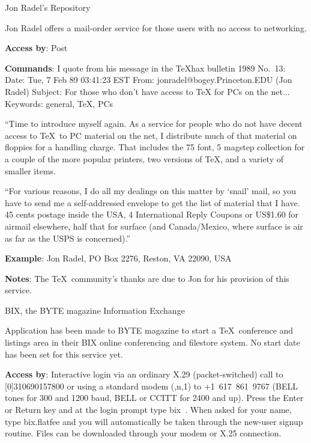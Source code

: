  {Jon Radel's Repository}

     Jon Radel offers a mail-order service for those users with no
     access to networking.

{\bf Access by}:  Post

{\bf Commands}:  I quote from his message in the TeXhax bulletin 1989
     No.~13:\nl
{\tx Date: Tue, 7 Feb 89 03:41:23 EST }\nl
{\tx From: jonradel@bogey.Princeton.EDU (Jon Radel) }\nl
{\tx Subject: For those who don't have access to TeX for PCs on the
              net...}\nl
{\tx Keywords: general, TeX, PCs }

   ``Time to introduce myself again. As a service for people who do not
     have decent access to \TeX\ to PC material on the net, I distribute
     much of that material on floppies for a handling charge.  That
     includes the 75 font, 5 magstep collection for a couple of the
     more popular printers, two versions of \TeX, and a variety of
     smaller items.

   ``For various reasons, I do all my dealings on this matter by `snail'
     mail, so you have to send me a self-addressed envelope to get the
     list of material that I have.  45 cents postage inside the USA,  4
     International Reply Coupons or US\$1.60 for airmail elsewhere, half
     that for surface (and Canada/Mexico, where surface is air as far as
     the USPS is concerned).''

{\bf Example}:\nl
     Jon Radel, \nl
     PO Box 2276, \nl
     Reston, \nl
     VA 22090, \nl
     USA

{\bf Notes}:  The \TeX\ community's thanks are due to Jon for his
     provision of this service.

 {BIX, the BYTE magazine Information
     Exchange}

     Application has been made to BYTE magazine to start a \TeX\
     conference and listings area in their BIX online conferencing
     and filestore system. No start date has been set for this service
     yet.

{\bf Access by}:  Interactive login via an ordinary X.29 (packet-switched)
     call to [0]310690157800 or using a standard modem ({\tx 8,n,1}) to
     +1~617~861~9767 (BELL tones for 300 and 1200 baud, BELL or CCITT
     for 2400 and up). Press the Enter or Return key and at the login
     prompt type {\tx bix}~. When asked for your name, type {\tx
     bix.flatfee} and you will automatically be taken through the
     new-user signup routine. Files can be downloaded through your modem
     or X.25 connection.

